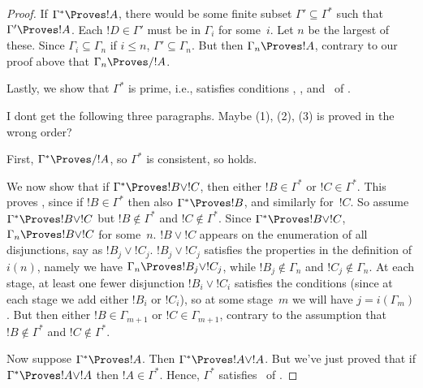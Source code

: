 \documentclass[../../../include/open-logic-section]{subfiles}
\begin{document}
\begin{proof}
  If $\Gamma^* \Proves !A$, there would be some finite subset $\Gamma'
  \subseteq \Gamma^*$ such that $\Gamma' \Proves !A$. Each $!D \in
  \Gamma'$ must be in $\Gamma_i$ for some~$i$.  Let $n$ be the largest
  of these. Since $\Gamma_i \subseteq \Gamma_n$ if $i \le n$, $\Gamma'
  \subseteq \Gamma_n$. But then $\Gamma_n \Proves !A$, contrary to our
  proof above that $\Gamma_n \Proves/ !A$.

  Lastly, we show that $\Gamma^*$ is prime, i.e., satisfies conditions
  , , and~ of
  .

  I dont get the following three paragraphs. Maybe (1), (2), (3) is
  proved in the wrong order?

  First, $\Gamma^* \Proves/ !A$, so $\Gamma^*$ is
  consistent, so  holds.

  We now show that if $\Gamma^* \Proves !B \lor !C$, then either $!B
  \in \Gamma^*$ or $!C \in \Gamma^*$. This proves ,
  since if $!B \in \Gamma^*$ then also $\Gamma^* \Proves !B$, and
  similarly for~$!C$. So assume $\Gamma^* \Proves !B \lor !C$ but $!B
  \notin \Gamma^*$ and $!C \notin \Gamma^*$. Since $\Gamma^* \Proves
  !B \lor !C$, $\Gamma_n \Proves !B \lor !C$ for some~$n$. $!B \lor
  !C$ appears on the enumeration of all disjunctions, say as $!B_j
  \lor !C_j$. $!B_j \lor !C_j$ satisfies the properties in the
  definition of $i(n)$, namely we have $\Gamma_n \Proves !B_j
  \lor !C_j$, while $!B_j \notin \Gamma_n$ and $!C_j \notin \Gamma_n$. At
  each stage, at least one fewer disjunction $!B_i \lor !C_i$
  satisfies the conditions (since at each stage we add either $!B_i$
  or $!C_i$), so at some stage~$m$ we will have $j = i(\Gamma_m)$. But
  then either $!B \in \Gamma_{m+1}$ or $!C \in \Gamma_{m+1}$, contrary
  to the assumption that $!B \notin \Gamma^*$ and $!C \notin
  \Gamma^*$.

  Now suppose $\Gamma^* \Proves !A$. Then $\Gamma^* \Proves !A \lor
  !A$. But we've just proved that if $\Gamma^* \Proves !A \lor !A$
  then $!A \in \Gamma^*$. Hence, $\Gamma^*$
  satisfies~ of .
\end{proof}
\end{document}
